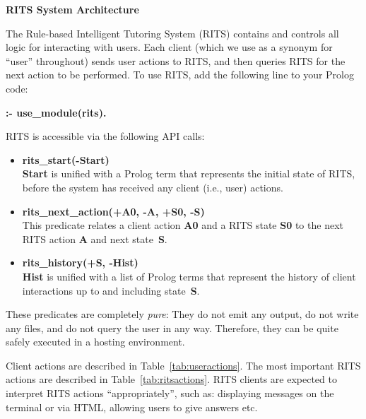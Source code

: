 \documentclass[a4paper,11pt]{article}
\begin{document}
\noindent
\begin{center}
\Large\textbf{RITS System Architecture}
\end{center}

\vspace{1cm}
\noindent
The Rule-based Intelligent Tutoring System (RITS) contains and
controls all logic for interacting with users. Each client (which we
use as a synonym for ``user'' throughout) sends user actions to RITS,
and then queries RITS for the next action to be performed. To use
RITS, add the following line to your Prolog code:

\bigskip
\textbf{:- use\_module(rits).}
\bigskip

\noindent RITS is accessible via the following API calls:

\begin{itemize}
\item \textbf{rits\_start(-Start)}\\\textbf{Start} is unified with a
  Prolog term that represents the initial state of RITS, before the
  system has received any client (i.e., user) actions.

\item \textbf{rits\_next\_action(+A0, -A, +S0, -S)}\\
  This predicate relates a client action \textbf{A0} and a RITS state
  \textbf{S0} to the next RITS action \textbf{A} and next
  state~\textbf{S}.

\item \textbf{rits\_history(+S, -Hist)}\\
  \textbf{Hist} is unified with a list of Prolog terms that represent
  the history of client interactions up to and including state~\textbf{S}.
\end{itemize}

These predicates are completely \textit{pure}: They do not emit any
output, do not write any files, and do not query the user in any way.
Therefore, they can be quite safely executed in a hosting environment.

Client actions are described in Table~\ref{tab:useractions}. The most
important RITS actions are described in Table~\ref{tab:ritsactions}.
RITS clients are expected to interpret RITS actions ``appropriately'',
such as: displaying messages on the terminal or via HTML, allowing
users to give answers etc.
\end{document}
